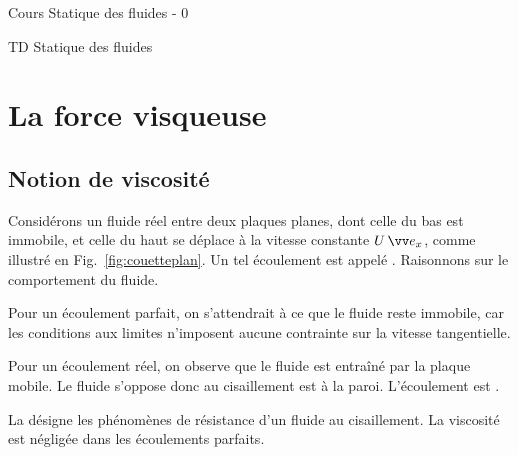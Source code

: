 \documentclass[12pt,fancy]{cours}
\begin{document}
{
	\item Cours Statique des fluides - 0
	\item TD Statique des fluides
}


\section{La force visqueuse}

\subsection{Notion de viscosité}
\label{sec:couette}

Considérons un fluide réel entre deux plaques planes, dont celle du bas est immobile, et celle du haut se déplace à la vitesse constante $U\,\ex$, comme illustré en Fig.~\ref{fig:couetteplan}. Un tel écoulement est appelé . Raisonnons sur le comportement du fluide.
\begin{liste}
	\item Pour un écoulement parfait, on s'attendrait à ce que le fluide reste immobile, car les conditions aux limites n'imposent aucune contrainte sur la vitesse tangentielle.
	\item Pour un écoulement réel, on observe que le fluide est entraîné par la plaque mobile. Le fluide s'oppose donc au cisaillement est  à la paroi. L'écoulement est .
\end{liste}

\begin{definition}[Viscosité]\label{def:}
	La  désigne les phénomènes de résistance d’un fluide au cisaillement. La viscosité est négligée dans les écoulements parfaits.
\end{definition}
\end{document}
